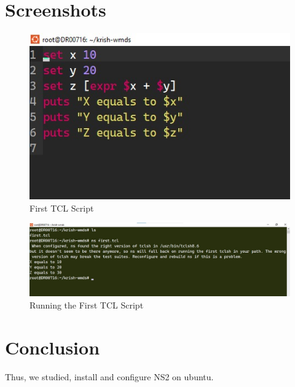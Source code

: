 \documentclass[11pt]{article}
\begin{document}
\section{Screenshots}

\begin{figure}[H]
    \centering
    \includegraphics[width=.95\textwidth]{../../Programs/Assignment 1/2.jpeg}
    \caption{First TCL Script}
\end{figure}

\begin{figure}[H]
    \centering
    \includegraphics[width=.95\textwidth]{../../Programs/Assignment 1/1.jpeg}
    \caption{Running the First TCL Script}
\end{figure}


% 

\section{Conclusion}
Thus, we studied, install and configure NS2 on ubuntu.

\clearpage
\end{document}
